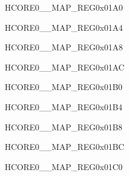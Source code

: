 \begin{register}{H}{CORE0\_\_MAP\_REG}{0x01A0}\label{regdesc:CORE0DMA2DINCH0INTMAPREG}
\end{register}\vspace{-3em}


\begin{register}{H}{CORE0\_\_MAP\_REG}{0x01A4}\label{regdesc:CORE0DMA2DINCH1INTMAPREG}
\end{register}\vspace{-3em}


\begin{register}{H}{CORE0\_\_MAP\_REG}{0x01A8}\label{regdesc:CORE0DMA2DOUTCH0INTMAPREG}
\end{register}\vspace{-3em}


\begin{register}{H}{CORE0\_\_MAP\_REG}{0x01AC}\label{regdesc:CORE0DMA2DOUTCH1INTMAPREG}
\end{register}\vspace{-3em}


\begin{register}{H}{CORE0\_\_MAP\_REG}{0x01B0}\label{regdesc:CORE0DMA2DOUTCH2INTMAPREG}
\end{register}\vspace{-3em}


\begin{register}{H}{CORE0\_\_MAP\_REG}{0x01B4}\label{regdesc:CORE0PSRAMMSPIINTMAPREG}
\end{register}\vspace{-3em}


\begin{register}{H}{CORE0\_\_MAP\_REG}{0x01B8}\label{regdesc:CORE0HPSYSREGINTMAPREG}
\end{register}\vspace{-3em}


\begin{register}{H}{CORE0\_\_MAP\_REG}{0x01BC}\label{regdesc:CORE0PCNTINTMAPREG}
\end{register}\vspace{-3em}


\begin{register}{H}{CORE0\_\_MAP\_REG}{0x01C0}\label{regdesc:CORE0HPPAUINTMAPREG}
\end{register}\vspace{-3em}


